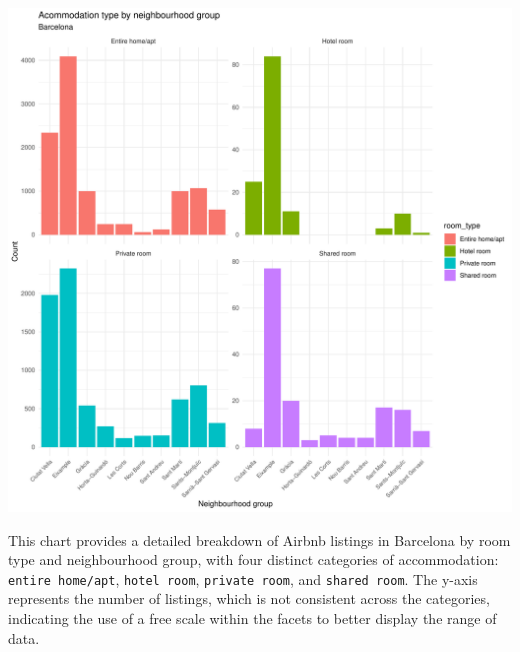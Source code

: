 \documentclass[
]{article}
\begin{document}
\begin{center}\includegraphics{Barcelona-AirBnB-Insights_files/figure-latex/plot5-1} \end{center}

This chart provides a detailed breakdown of Airbnb listings in Barcelona
by room type and neighbourhood group, with four distinct categories of
accommodation: \texttt{entire\ home/apt}, \texttt{hotel\ room},
\texttt{private\ room}, and \texttt{shared\ room}. The y-axis represents
the number of listings, which is not consistent across the categories,
indicating the use of a free scale within the facets to better display
the range of data.
\end{document}
